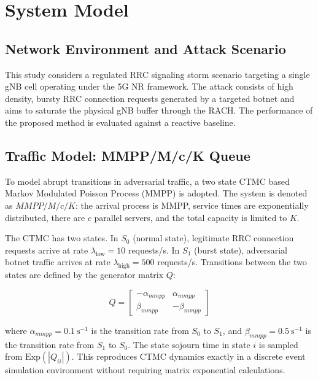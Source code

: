 \documentclass[conference]{IEEEtran}
\begin{document}
\section{System Model}

\subsection{Network Environment and Attack Scenario}

This study considers a regulated RRC signaling storm scenario targeting a single gNB cell operating under the 5G NR framework. The attack consists of high density, bursty RRC connection requests generated by a targeted botnet and aims to saturate the physical gNB buffer through the RACH. The performance of the proposed method is evaluated against a reactive baseline.

\subsection{Traffic Model: MMPP/M/c/K Queue}

To model abrupt transitions in adversarial traffic, a two state CTMC based Markov Modulated Poisson Process (MMPP) is adopted. The system is denoted as $MMPP/M/c/K$: the arrival process is MMPP, service times are exponentially distributed, there are $c$ parallel servers, and the total capacity is limited to $K$.

The CTMC has two states. In $S_0$ (normal state), legitimate RRC connection requests arrive at rate $\lambda_{\mathrm{low}} = 10$ requests/s. In $S_1$ (burst state), adversarial botnet traffic arrives at rate $\lambda_{\mathrm{high}} = 500$ requests/s. Transitions between the two states are defined by the generator matrix $Q$:

\begin{equation}
Q = \begin{bmatrix}
    -\alpha_{mmpp} & \alpha_{mmpp} \\
    \beta_{mmpp}   & -\beta_{mmpp}
\end{bmatrix}
\label{eq:generator}
\end{equation}

where $\alpha_{mmpp} = 0.1\ \mathrm{s}^{-1}$ is the transition rate from $S_0$ to $S_1$, and $\beta_{mmpp} = 0.5\ \mathrm{s}^{-1}$ is the transition rate from $S_1$ to $S_0$. The state sojourn time in state $i$ is sampled from $\mathrm{Exp}(|Q_{ii}|)$. This reproduces CTMC dynamics exactly in a discrete event simulation environment without requiring matrix exponential calculations.
\end{document}
